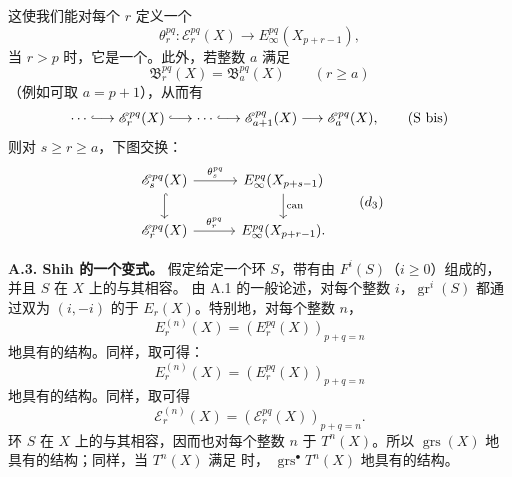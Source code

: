 这使我们能对每个 $r$ 定义一个
\[
\theta_r^{pq}:\mathscr E_r^{pq}(X)\longrightarrow E_\infty^{pq}(X_{p+r-1}),
\]
当 $r>p$ 时，它是一个。此外，若整数 $a$ 满足
\[
\mathfrak B_r^{pq}(X)=\mathfrak B_a^{pq}(X)\qquad(r\geq a)
\]
（例如可取 $a=p+1$），从而有
\[
\cdots\lhook\joinrel\longrightarrow\mathscr E_r^{pq}(X)\lhook\joinrel\longrightarrow\cdots\lhook\joinrel\longrightarrow\mathscr E_{a+1}^{pq}(X)\longrightarrow\mathscr E_a^{pq}(X),
\tag{S bis}
\]
则对 $s\geq r\geq a$，下图交换：
\[
\begin{tikzcd}[column sep=3em]
\mathscr E_s^{pq}(X)\arrow[r,"\theta_s^{pq}"]\arrow[d,hook]&E_\infty^{pq}(X_{p+s-1})\arrow[d,"\mathrm{can}"]\\
\mathscr E_r^{pq}(X)\arrow[r,"\theta_r^{pq}"]&E_\infty^{pq}(X_{p+r-1}).
\end{tikzcd}
\tag{$d_3$}
\]

\textbf{A.3. Shih 的一个变式。} 假定给定一个环 $S$，带有由 $F^i(S)$（$i\geq0$）组成的，并且 $S$ 在 $X$ 上的与其相容。
由 A.1 的一般论述，对每个整数 $i$，$\operatorname{gr}^i(S)$ 都通过双为 $(i,-i)$ 的于 $E_r(X)$。特别地，对每个整数 $n$，
\[
E_r^{(n)}(X)=(E_r^{pq}(X))_{p+q=n}
\]
地具有的结构。同样，取可得：
\[
E_r^{(n)}(X)=(E_r^{pq}(X))_{p+q=n}
\]
地具有的结构。同样，取可得
\[
\mathscr E_r^{(n)}(X)=(\mathscr E_r^{pq}(X))_{p+q=n}.
\]
环 $S$ 在 $X$ 上的与其相容，因而也对每个整数 $n$ 于 $T^n(X)$。所以 $\operatorname{grs}(X)$ 地具有的结构；同样，当 $T^n(X)$ 满足 时， $\operatorname{grs}^{\bullet}T^n(X)$ 地具有的结构。

